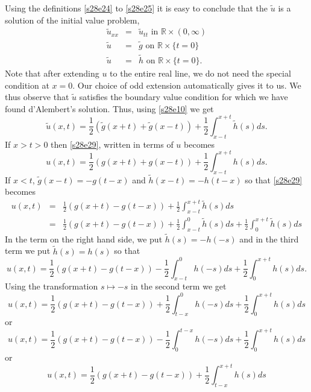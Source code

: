 \documentclass{article}
\theoremstyle{plain}
\numberwithin{thm}{section}
\theoremstyle{plain}
\numberwithin{prop}{section}
\theoremstyle{definition}
\numberwithin{defn}{section}
\theoremstyle{remark}
\numberwithin{equation}{section}
\begin{document}
Using the definitions \eqref{s28e24} to \eqref{s28e25} it is easy to conclude that the $\tilde{u}$ is a solution of 
the initial value problem,
\begin{eqnarray}
\tilde{u}_{xx} &=& \tilde{u}_{tt} \text{ in } \mathbb{R} \times (0, \infty) \label{s28e26} \\
\tilde{u} &=& \tilde{g} \text{ on } \mathbb{R} \times \{t = 0\} \label{s28e27} \\
\tilde{u} &=& \tilde{h} \text{ on } \mathbb{R} \times \{t = 0\} \label{s28e28}.
\end{eqnarray}
Note that after extending $u$ to the entire real line, we do not need the special condition at $x = 0$. Our choice 
of odd extension automatically gives it to us. We thus observe that $\tilde{u}$ satisfies the boundary value 
condition for which we have found d'Alembert's solution. Thus, using \eqref{s28e10} we get
\begin{equation}\label{s28e29}
\tilde{u}(x, t) = \frac{1}{2}(\tilde{g}(x+t) + \tilde{g}(x-t)) + \frac{1}{2}\int_{x-t}^{x+t}\tilde{h}(s)ds.
\end{equation}
If $x > t > 0$ then \eqref{s28e29}, written in terms of $u$ becomes
\begin{equation}\label{s28e30}
u(x, t) = \frac{1}{2}(g(x+t) + g(x-t)) + \frac{1}{2}\int_{x-t}^{x+t}h(s)ds.
\end{equation}
If $x < t$, $\tilde{g}(x-t) = -g(t-x)$ and $\tilde{h}(x-t) = -h(t-x)$ so that \eqref{s28e29} becomes
\begin{eqnarray*}
u(x,t) &=& \frac{1}{2}(g(x+t) - g(t-x)) + \frac{1}{2}\int_{x-t}^{x+t}\tilde{h}(s)ds \\
 &=& \frac{1}{2}(g(x+t) - g(t-x)) + \frac{1}{2}\int_{x-t}^{0}\tilde{h}(s)ds + 
 \frac{1}{2}\int_{0}^{x+t}\tilde{h}(s)ds
\end{eqnarray*}
In the term on the right hand side, we put $\tilde{h}(s) = -h(-s)$ and in the third term we put $\tilde{h}(s) =
h(s)$ so that 
\[
u(x,t) = \frac{1}{2}(g(x+t) - g(t-x))-\frac{1}{2}\int_{x-t}^{0}h(-s)ds+\frac{1}{2}\int_{0}^{x+t}h(s)ds.
\]
Using the transformation $s \mapsto -s$ in the second term we get
\[
u(x,t) = \frac{1}{2}(g(x+t)-g(t-x))+\frac{1}{2}\int_{t-x}^{0}h(-s)ds+\frac{1}{2}\int_{0}^{x+t}h(s)ds
\]
or
\[
u(x,t) = \frac{1}{2}(g(x+t)-g(t-x))-\frac{1}{2}\int_{0}^{t-x}h(-s)ds+\frac{1}{2}\int_{0}^{x+t}h(s)ds
\]
or
\begin{equation}\label{s28e31}
u(x,t) = \frac{1}{2}(g(x+t)-g(t-x)) + \frac{1}{2}\int_{t-x}^{x+t}h(s)ds
\end{equation}
\end{document}
